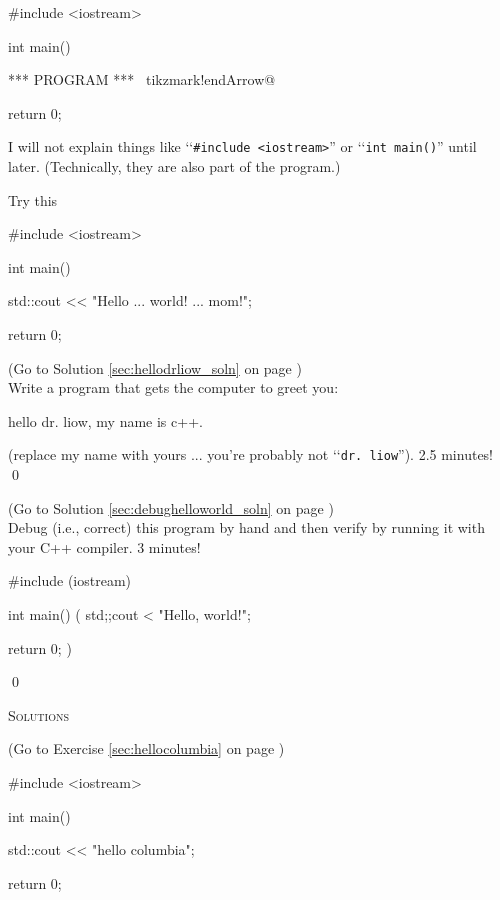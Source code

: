 \begin{console}[commandchars=\~\!\@]
#include <iostream>

int main()
{

    *** PROGRAM *** ~tikzmark!endArrow@
    
    return 0;
}
\end{console}

I will not explain things like 
\lq\lq \verb!#include <iostream>!'' or 
\lq\lq\verb!int main()!'' until later. 
(Technically, they are also part of  the program.)



Try this
\begin{console}
#include <iostream>

int main()
{
    std::cout << "Hello ... world! ... mom!\n";

    return 0;
}
\end{console}



\begin{ex} 
\label{sec:hellodrliow}
(Go to Solution \ref{sec:hellodrliow_soln} 
on page \pageref{sec:hellodrliow_soln}) 
\\
Write a program that gets the computer to greet you:
\begin{console}
hello dr. liow, my name is c++.
\end{console}
(replace my name with yours ...  you're probably not 
\lq\lq\verb!dr. liow!'').
2.5 minutes!
\qed
\end{ex}


\begin{ex}
\label{sec:debughelloworld}
(Go to Solution \ref{sec:debughelloworld_soln} 
on page \pageref{sec:debughelloworld_soln}) 
\\
Debug (i.e., correct) this program by hand 
and then verify by running it 
with your C++ compiler.
3 minutes!
\begin{console}
#include (iostream)

int main()
(
    std;;cout < "Hello, world!\n";

    return 0;
)
\end{console}
\qed
\end{ex}



\newpage\textsc{Solutions}

\begin{soln}\label{sec:hellocolumbia_soln}
(Go to Exercise \ref{sec:hellocolumbia} on page \pageref{sec:hellocolumbia})
\begin{console}
#include <iostream>

int main()
{
    std::cout << "hello columbia\n";

    return 0;
}
\end{console}
\end{soln}


